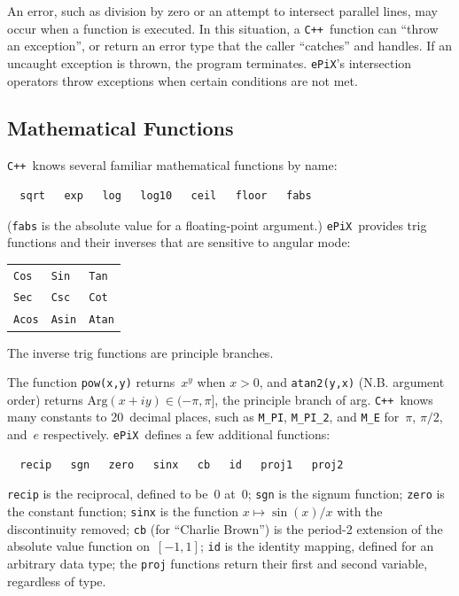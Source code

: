 \documentclass[12pt]{report}
\newcommand{\code}[1]{\texttt{#1}}
\newcommand{\ePiX}{\code{ePiX}}
\newcommand{\CXX}{\code{C++}}
\begin{document}
An error, such as division by zero or an attempt to intersect parallel
lines, may occur when a function is executed. In this situation, a
\CXX\ function can ``throw an exception'', or return an error type
that the caller ``catches'' and handles. If an uncaught exception is
thrown, the program terminates. \ePiX's intersection operators throw
exceptions when certain conditions are not met.


\subsection*{Mathematical Functions}

\CXX~knows several familiar mathematical functions by name:
\begin{verbatim}
  sqrt   exp   log   log10   ceil   floor   fabs
\end{verbatim}
(\code{fabs} is the absolute value for a floating-point argument.)
\ePiX\ provides trig functions and their inverses that are sensitive
to angular mode:
\begin{center}
\begin{tabular}{p{1.25in}p{1.25in}p{1.25in}}
  \code{Cos}  & \code{Sin}  & \code{Tan} \\
  \code{Sec}  & \code{Csc}  & \code{Cot} \\
  \code{Acos} & \code{Asin} & \code{Atan}
\end{tabular}
\end{center}
The inverse trig functions are principle branches.

The function \code{pow(x,y)} returns~$x^y$ when $x>0$, and
\code{atan2(y,x)} (N.B. argument order) returns
$\mathrm{Arg}(x+iy)\in(-\pi,\pi]$, the principle branch of arg.
\CXX~knows many constants to 20~decimal places, such as \code{M\_PI},
\code{M\_PI\_2}, and \code{M\_E} for~$\pi$, $\pi/2$, and~$e$
respectively.  \ePiX\ defines a few additional functions:
\begin{verbatim}
  recip   sgn   zero   sinx   cb   id   proj1   proj2
\end{verbatim}
\begin{center}
  \qquad
  \qquad
  
\end{center}
\code{recip} is the reciprocal, defined to be~$0$ at~$0$; \code{sgn}
is the signum function; \code{zero} is the constant function;
\code{sinx} is the function $x\mapsto \sin(x)/x$ with the
discontinuity removed; \code{cb} (for ``Charlie Brown'') is the
period-2 extension of the absolute value function on~$[-1,1]$;
\code{id} is the identity mapping, defined for an arbitrary data type;
the \code{proj} functions return their first and second variable,
regardless of type.
\end{document}
